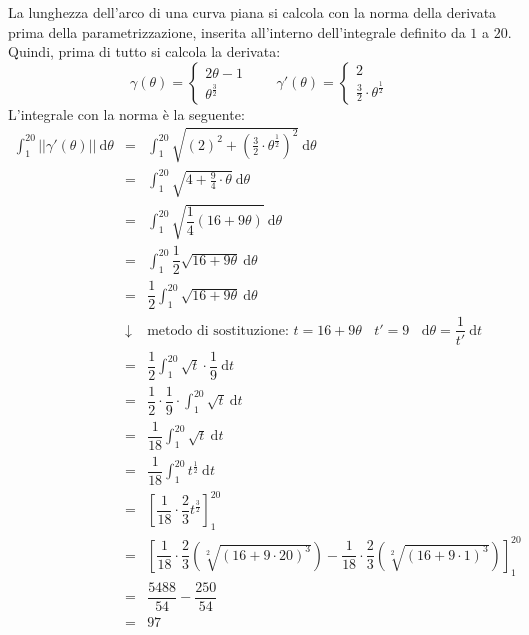 \documentclass[a4paper]{article}
\begin{document}
	\noindent
	La lunghezza dell'arco di una curva piana si calcola con la norma della derivata prima della parametrizzazione, inserita all'interno dell'integrale definito da $1$ a $20$. Quindi, prima di tutto si calcola la derivata:
	\begin{equation*}
		\gamma\left(\theta\right) = 
		\begin{cases}
			2\theta-1 \\
			\theta^{\frac{3}{2}}
		\end{cases}
		\hspace{2em}
		\gamma'\left(\theta\right) 
		= 
		\begin{cases}
			2 \\
			\frac{3}{2} \cdot \theta^{\frac{1}{2}}
		\end{cases}
	\end{equation*}
	L'integrale con la norma è la seguente:
	\begin{equation*}
		\begin{array}{rcl}
			\displaystyle\int_{1}^{20} \left|\left| \gamma'\left(\theta\right) \right|\right| \:\mathrm{d}\theta 
			&=& 
			\displaystyle\int_{1}^{20} \sqrt{\left(2\right)^{2} + \left(\frac{3}{2} \cdot \theta^{\frac{1}{2}}\right)^{2}} \:\mathrm{d}\theta \\ [1.5em]
			&=& 
			\displaystyle\int_{1}^{20} \sqrt{4 + \frac{9}{4} \cdot \theta} \:\mathrm{d}\theta \\ [1.5em]
			&=& 
			\displaystyle\int_{1}^{20} \sqrt{\dfrac{1}{4}\left(16 + 9\theta\right)} \:\mathrm{d}\theta \\ [1.5em]
			&=& 
			\displaystyle\int_{1}^{20} \dfrac{1}{2}\sqrt{16 + 9\theta} \:\mathrm{d}\theta \\ [1.5em]
			&=& 
			\dfrac{1}{2} \displaystyle\int_{1}^{20} \sqrt{16 + 9\theta} \:\mathrm{d}\theta \\ [1em]
			&\downarrow& \text{metodo di sostituzione: }t = 16+9\theta \:\:\:\: t'=9 \:\:\:\: \mathrm{d}\theta = \dfrac{1}{t'} \:\mathrm{d}t \\ [1em]
			&=&
			\dfrac{1}{2} \displaystyle\int_{1}^{20} \sqrt{t} \cdot \dfrac{1}{9} \:\mathrm{d}t \\ [1.3em]
			&=&
			\dfrac{1}{2} \cdot \dfrac{1}{9} \cdot \displaystyle\int_{1}^{20} \sqrt{t} \:\mathrm{d}t \\ [1.3em]
			&=&
			\dfrac{1}{18} \displaystyle\int_{1}^{20} \sqrt{t} \:\mathrm{d}t \\ [1.3em]
			&=&
			\dfrac{1}{18} \displaystyle\int_{1}^{20} t^{\frac{1}{2}} \:\mathrm{d}t \\ [1.3em]
			&=&
			\left[\dfrac{1}{18} \cdot \dfrac{2}{3} t^{\frac{3}{2}}\right]_{1}^{20} \\ [1.3em]
			&=&
			\left[
				\dfrac{1}{18} \cdot \dfrac{2}{3} \left(\sqrt[2]{\left(16+9 \cdot 20\right)^{3}}\right) 
				- 
				\dfrac{1}{18} \cdot \dfrac{2}{3} \left(\sqrt[2]{\left(16+9 \cdot 1\right)^{3}}\right)
			\right]_{1}^{20} \\ [1.3em]
			&=&
			\dfrac{5488}{54} - \dfrac{250}{54} \\ [1em]
			&=& 97
		\end{array}
	\end{equation*}\newpage
\end{document}
